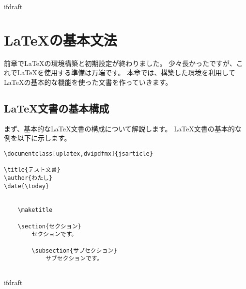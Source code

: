 \expandafter\ifx\csname ifdraft\endcsname\relax
    
    \graphicspath{{./figure/}}

\fi

\chapter{\LaTeX の基本文法}
    前章で\LaTeX の環境構築と初期設定が終わりました。
    少々長かったですが、これで\LaTeX を使用する準備は万端です。
    本章では、構築した環境を利用して\LaTeX の基本的な機能を使った文書を作っていきます。

    \section{\LaTeX 文書の基本構成}
        まず、基本的な\LaTeX 文書の構成について解説します。
        \LaTeX 文書の基本的な例を以下に示します。
        
        \begin{verbatim}
\documentclass[uplatex,dvipdfmx]{jsarticle}

\title{テスト文書}
\author{わたし}
\date{\today}


    \maketitle

    \section{セクション}
        セクションです。

        \subsection{サブセクション}
            サブセクションです。


        \end{verbatim}


			\expandafter\ifx\csname ifdraft\endcsname\relax

\fi